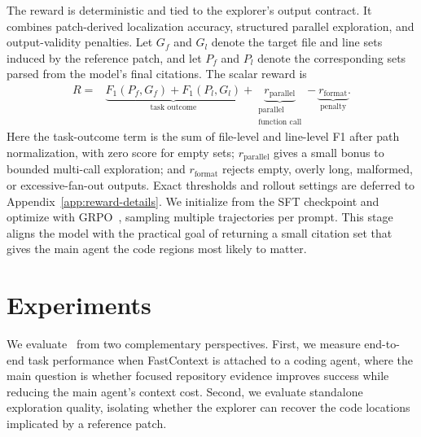 \documentclass{llmxive}
\providecommand{\approach}{~}
\begin{document}
The reward is deterministic and tied to the explorer's output contract.
It combines patch-derived localization accuracy, structured parallel exploration, and output-validity penalties.
Let $G_f$ and $G_l$ denote the target file and line sets induced by the reference patch, and let $P_f$ and $P_l$ denote the corresponding sets parsed from the model's final citations.
The scalar reward is
\begin{equation}
\begin{aligned}
R =
&\underbrace{F_1(P_f, G_f) + F_1(P_l, G_l)}_{\text{task outcome}}
+ \underbrace{r_{\mathrm{parallel}}}_{\substack{\text{parallel}\\\text{function call}}}
- \underbrace{r_{\mathrm{format}}}_{\text{penalty}}.
\end{aligned}
\end{equation}
Here the task-outcome term is the sum of file-level and line-level F1 after path normalization, with zero score for empty sets; $r_{\mathrm{parallel}}$ gives a small bonus to bounded multi-call exploration; and $r_{\mathrm{format}}$ rejects empty, overly long, malformed, or excessive-fan-out outputs.
Exact thresholds and rollout settings are deferred to Appendix~\ref{app:reward-details}.
We initialize from the SFT checkpoint and optimize with GRPO~\cite{shao2024deepseekmathpushinglimitsmathematical}, sampling multiple trajectories per prompt.
This stage aligns the model with the practical goal of returning a small citation set that gives the main agent the code regions most likely to matter.

\section{Experiments}
\label{sec:experiments}

We evaluate \approach from two complementary perspectives.
First, we measure end-to-end task performance when FastContext is attached to a coding agent, where the main question is whether focused repository evidence improves success while reducing the main agent's context cost.
Second, we evaluate standalone exploration quality, isolating whether the explorer can recover the code locations implicated by a reference patch.
\end{document}
